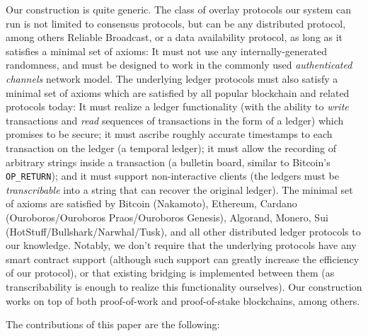 Our construction is quite generic.
The class of overlay protocols our system can run is not limited to consensus protocols,
but can be any distributed protocol, among others Reliable Broadcast, or a data availability
protocol, as long as it satisfies a minimal set of axioms: It must not use any
internally-generated randomness, and must be designed to work in the commonly used
\emph{authenticated channels} network model. The underlying ledger protocols must also
satisfy a minimal set of axioms which are satisfied by all popular blockchain and
related protocols today: It must realize a ledger functionality (with the ability
to \emph{write} transactions and \emph{read} sequences of transactions in the form of a ledger)
which promises to be secure; it must ascribe roughly accurate timestamps to each transaction on the ledger (a temporal ledger);
it must allow the recording of arbitrary strings inside a transaction (a bulletin board,
similar to Bitcoin's \texttt{OP\_RETURN});
and it must support non-interactive clients (the ledgers must be \emph{transcribable}
into a string that can recover the original ledger).
The minimal set of axioms are satisfied by Bitcoin (Nakamoto), Ethereum, Cardano
(Ouroboros/Ouroboros Praos/Ouroboros Genesis), Algorand, Monero, Sui
(HotStuff/Bullshark/Narwhal/Tusk), and all other distributed ledger protocols
to our knowledge. Notably, we don't require that the underlying protocols have
any smart contract support (although such support can greatly increase the efficiency
of our protocol), or that existing bridging is implemented between them (as
transcribability is enough to realize this functionality ourselves). Our construction works on
top of both proof-of-work and proof-of-stake blockchains, among others.

The contributions of this paper are the following:

